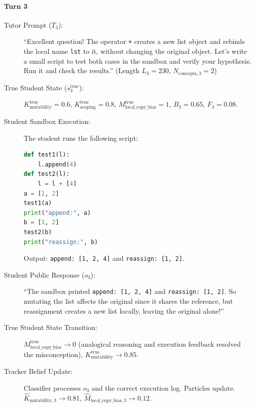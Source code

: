 \documentclass[11pt,a4paper]{report}
\begin{document}
\paragraph{Turn 3}
\begin{description}
    \item[Tutor Prompt ($T_3$):] ``Excellent question! The operator \texttt{+} creates a new list object and rebinds the local name \texttt{lst} to it, without changing the original object. Let's write a small script to test both cases in the sandbox and verify your hypothesis. Run it and check the results.'' (Length $L_3 = 230$, $N_{\text{concepts}, 3} = 2$)
    \item[True Student State ($s_3^{\text{true}}$):] $K^{\text{true}}_{\text{mutability}} = 0.6$, $K^{\text{true}}_{\text{scoping}} = 0.8$, $M^{\text{true}}_{\text{local\_copy\_bias}} = 1$, $B_3 = 0.65$, $F_3 = 0.08$.
    \item[Student Sandbox Execution:] The student runs the following script:
\begin{lstlisting}[language=Python]
def test1(l):
    l.append(4)
def test2(l):
    l = l + [4]
a = [1, 2]
test1(a)
print("append:", a)
b = [1, 2]
test2(b)
print("reassign:", b)
\end{lstlisting}
    Output: \texttt{append: [1, 2, 4]} and \texttt{reassign: [1, 2]}.
    \item[Student Public Response ($o_3$):] ``The sandbox printed \texttt{append: [1, 2, 4]} and \texttt{reassign: [1, 2]}. So mutating the list affects the original since it shares the reference, but reassignment creates a new list locally, leaving the original alone!''
    \item[True Student State Transition:] $M^{\text{true}}_{\text{local\_copy\_bias}} \to 0$ (analogical reasoning and execution feedback resolved the misconception), $K^{\text{true}}_{\text{mutability}} \to 0.85$.
    \item[Tracker Belief Update:] Classifier processes $o_3$ and the correct execution log. Particles update. $\hat{K}_{\text{mutability}, 3} \to 0.81$, $\hat{M}_{\text{local\_copy\_bias}, 3} \to 0.12$.
\end{description}
\end{document}
